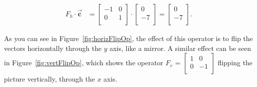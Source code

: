\vspace{-.15in}
\begin{align*}
F_{h} \cdot \overrightarrow{\textbf{c}} &=
\begin{bmatrix}
-1 & 0 \\
0 & 1 \\
\end{bmatrix} \cdot
\begin{bmatrix}
0 \\ -7 \\
\end{bmatrix} =
\begin{bmatrix}
0 \\ -7 \\
\end{bmatrix}.
\end{align*}
\vspace{-.15in}

As you can see in Figure~\ref{fig:horizFlipOp}, the effect of this operator is
to flip the vectors horizontally through the $y$ axis, like a mirror. A similar
effect can be seen in Figure~\ref{fig:vertFlipOp}, which shows the operator
$F_v$ = {\scriptsize $\begin{bmatrix} 1 & 0 \\ 0 & -1 \\ \end{bmatrix}$}
flipping the picture vertically, through the $x$ axis.

